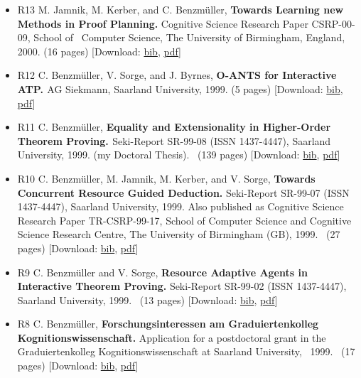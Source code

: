 \documentclass{article}
\newcommand{\tmtextbf}[1]{{\bfseries{#1}}}
\newenvironment{itemizedot}{\begin{itemize} \renewcommand{\labelitemi}{$\bullet$}\renewcommand{\labelitemii}{$\bullet$}\renewcommand{\labelitemiii}{$\bullet$}\renewcommand{\labelitemiv}{$\bullet$}}{\end{itemize}}
\begin{document}
\begin{itemizedot}
  \item [R13] {\small M. Jamnik, M. Kerber, and C. Benzm\"uller,
  \tmtextbf{Towards Learning new Methods in Proof Planning.}} {\small
  Cognitive Science Research Paper CSRP-00-09, School of \ Computer Science,
  The University of Birmingham, England, 2000. (16 pages)} {\color{grey}
  [Download: {\small \href{../papers/R13.bib}{bib},
  \href{../papers/R13.pdf}{pdf}}]}
  
  \item [R12] {\small C. Benzm\"uller, V. Sorge, and J. Byrnes,
  \tmtextbf{O-ANTS for Interactive ATP. }AG Siekmann, Saarland University,
  1999. (5 pages)} {\color{grey} [Download: {\small
  \href{../papers/R12.bib}{bib}, \href{../papers/R12.pdf}{pdf}}]}
  
  \item [R11] {\small C. Benzm\"uller, \tmtextbf{Equality and Extensionality
  in Higher-Order Theorem Proving. }} {\small Seki-Report SR-99-08 (ISSN
  1437-4447), Saarland University, 1999. (my Doctoral Thesis). \ (139 pages)}
  {\color{grey} [Download: {\small \href{../papers/R11.bib}{bib},
  \href{../papers/R11.pdf}{pdf}}]}
  
  \item [R10] {\small C. Benzm\"uller, M. Jamnik, M. Kerber, and V. Sorge,
  \tmtextbf{Towards Concurrent Resource Guided Deduction.}} {\small
  Seki-Report SR-99-07 (ISSN 1437-4447), Saarland University, 1999. Also
  published as Cognitive Science Research Paper TR-CSRP-99-17, School of
  Computer Science and Cognitive Science Research Centre, The University of
  Birmingham (GB), 1999. \ (27 pages)} {\color{grey} [Download: {\small
  \href{../papers/R10.bib}{bib}, \href{../papers/R10.pdf}{pdf}}]}
  
  \item [R9] {\small C. Benzm\"uller and V. Sorge, \tmtextbf{Resource Adaptive
  Agents in Interactive Theorem Proving.}} {\small Seki-Report SR-99-02 (ISSN
  1437-4447), Saarland University, 1999. \ (13 pages)} {\color{grey}
  [Download: {\small \href{../papers/R9.bib}{bib},
  \href{../papers/R9.pdf}{pdf}}]}
  
  \item [R8] {\small C. Benzm\"uller, \tmtextbf{Forschungsinteressen am
  Graduiertenkolleg Kognitionswissenschaft.} Application for a postdoctoral
  grant in the Graduiertenkolleg Kognitionswissenschaft at Saarland
  University, \ 1999. \ (17 pages)} {\color{grey} [Download: {\small
  \href{../papers/R8.bib}{bib}, \href{../papers/R8.pdf}{pdf}}]}
  

\end{itemizedot}
\end{document}
